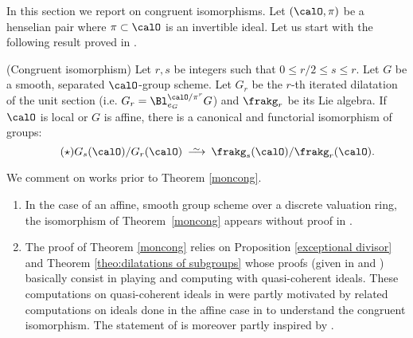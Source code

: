 \documentclass[10pt]{alggeom}
\renewcommand{\le}{\leqslant}
\theoremstyle{definition}
\numberwithin{equation}{section}
\newcommand*\isomto{%
  \renewcommand{\arraystretch}{0.1}
  \begin{array}[b]{c} {}_{\sim} \\ \longrightarrow \end{array}%
}
\begin{document}
In this section we report on congruent isomorphisms. Let $(\calO,\pi)$ be a henselian pair where $\pi\subset \calO$ is
an invertible ideal. 
Let us start with the following result proved in \cite{MRR20}.


 (Congruent isomorphism) \label{moncong}
Let $r,s$ be integers such that $0\le r/2\le s\le r$.
 Let $G$ be a smooth, separated
$\calO$-group scheme. Let $G_r$ be the $r$-th iterated dilatation of
the unit section (i.e. $G_r = \Bl _{e_G}^{\calO /\pi^r} G$) and $\frakg_r$ be its Lie algebra. If $\calO$ is
local or $G$ is affine, there is a canonical and functorial
isomorphism of groups:
\[\tag{$\star$} G_s(\calO)/G_r(\calO) \isomto \frakg_s(\calO)/\frakg_r(\calO).
\]
\xtheo


\rema \label{rem1iso} We comment on works prior to Theorem \ref{moncong}. \begin{enumerate} \item 
In the case of an affine, smooth group scheme
over a discrete valuation ring, the isomorphism of
Theorem~\ref{moncong} appears without proof in \cite[proof of Lemma 2.8]{Yu15}. 

\item 
The proof of Theorem \ref{moncong} relies on Proposition \ref{exceptional divisor} and Theorem \ref{theo:dilatations of subgroups} whose proofs (given in \cite[Prop. 2.9]{MRR20} and \cite[Th. 3.5]{MRR20}) basically consist in playing and computing with quasi-coherent ideals. These computations on quasi-coherent ideals in \cite{MRR20} were partly motivated by related computations on ideals done in the affine case in \cite[Appendix A]{Ma19t} to understand the congruent isomorphism. The statement of \cite[Th. 3.5]{MRR20} is moreover partly inspired by \cite[Th. 1.5, Th. 1.7]{WW80}. 


\end{enumerate}
\end{document}
